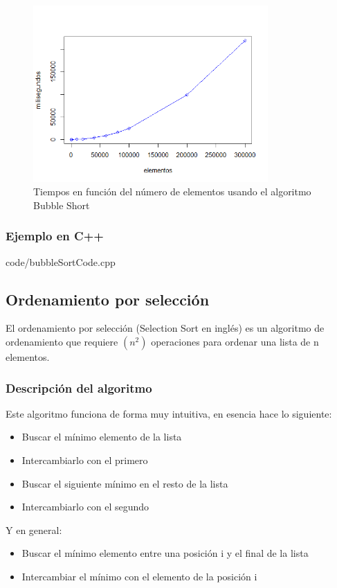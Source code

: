 \documentclass[8pt, A4]{article}    %
\newcommand{\grisclaro}{\color[gray]{0.99}}
\newcommand{\showprog}[1]
{
\begin{minipage}{\textwidth}

 {code/#1}
\end{minipage} 
}
\begin{document}
\begin{figure}[h]
\begin{center}
\includegraphics[width=0.8\textwidth]{graph/bubbleSortTime}
\end{center}
\caption{Tiempos en función del número de elementos usando el algoritmo Bubble Short}
\label{fig:bubbleSortTime}
\end{figure}

\subsubsection{Ejemplo en C++}

\showprog{bubbleSortCode.cpp}

\newpage


\subsection{Ordenamiento por selección}

El ordenamiento por selección (Selection Sort en inglés) es un algoritmo de ordenamiento que requiere ${\displaystyle (n^{2})}$ operaciones para ordenar una lista de n elementos.

\subsubsection{Descripción del algoritmo}
Este algoritmo funciona de forma muy intuitiva, en esencia hace lo siguiente:

\begin{itemize}
	\item Buscar el mínimo elemento de la lista
    \item Intercambiarlo con el primero
    \item Buscar el siguiente mínimo en el resto de la lista
    \item Intercambiarlo con el segundo
\end{itemize}
Y en general:
\begin{itemize}
   \item  Buscar el mínimo elemento entre una posición i y el final de la lista
    \item Intercambiar el mínimo con el elemento de la posición i
\end{itemize}
\end{document}
